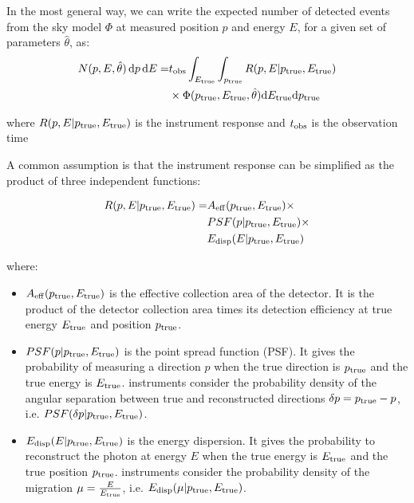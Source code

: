 \documentclass[traditabstract, longauth]{aa}
\begin{document}

In the most general way, we can write the expected number of detected events from the sky model $\Phi$ at measured position $p$ and energy $E$, for
a given set of parameters $\hat{\theta}$, as:
%
\begin{equation}
	\begin{split}
   		N(p, E, \hat{\theta})\,{\rm d}p\,{\rm d}E = &t_{\rm obs} \int_{E_{\rm true}} \int_{p_{\rm true}}  R(p, E|p_{\rm true}, E_{\rm true}) \\
   		&\times \Phi(p_{\rm true}, E_{\rm true}, \hat{\theta} ) {\rm d}E_{\rm true} {\rm d}p_{\rm true}
	\end{split}
\end{equation}

where $R(p, E| p_{\rm true}, E_{\rm true})$ is the instrument response and $t_{\rm obs}$ is the observation time

A common assumption is that the instrument response can be simplified as the product
of three independent functions:

\begin{equation}
	\begin{split}
   R(p, E|p_{\rm true}, E_{\rm true}) = &A_{\rm eff}(p_{\rm true}, E_{\rm true}) \times \\
    &PSF(p|p_{\rm true}, E_{\rm true}) \times \nonumber \\
    &E_{\rm disp}(E|p_{\rm true}, E_{\rm true})
	\end{split}
\end{equation}

where:
\begin{itemize}
\item $A_{\rm eff}(p_{\rm true}, E_{\rm true})$ is the effective collection area of the detector. It is the product
  of the detector collection area times its detection efficiency at true energy $E_{\rm true}$ and position $p_{\rm true}$.
\item $PSF(p|p_{\rm true}, E_{\rm true})$ is the point spread function (PSF). It gives the probability of
  measuring a direction $p$ when the true direction is $p_{\rm true}$ and the true energy is $E_{\rm true}$.
  \gammaray instruments consider the probability density of the angular separation between true and reconstructed directions
  $\delta p = p_{\rm true} - p$, i.e. $PSF(\delta p|p_{\rm true}, E_{\rm true})$.
\item $E_{\rm disp}(E|p_{\rm true}, E_{\rm true})$ is the energy dispersion. It gives the probability to
  reconstruct the photon at energy $E$ when the true energy is $E_{\rm true}$ and the true position $p_{\rm true}$.
  \gammaray instruments consider the probability density of the migration $\mu=\frac{E}{E_{\rm true}}$,
  i.e. $E_{\rm disp}(\mu|p_{\rm true}, E_{\rm true})$.
\end{itemize}
\end{document}
